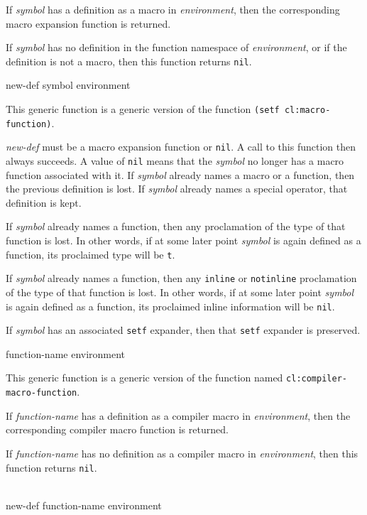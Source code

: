 If \textit{symbol} has a definition as a macro in
\textit{environment}, then the corresponding macro expansion function
is returned.

If \textit{symbol} has no definition in the function namespace of
\textit{environment}, or if the definition is not a macro, then this
function returns \texttt{nil}.

 {new-def symbol environment}

This generic function is a generic version of the \commonlisp{}
function \texttt{(setf cl:macro-function)}.

\textit{new-def} must be a macro expansion function or \texttt{nil}.
A call to this function then always succeeds.  A value of \texttt{nil}
means that the \textit{symbol} no longer has a macro function
associated with it.  If \textit{symbol} already names a macro or a
function, then the previous definition is lost.  If \textit{symbol}
already names a special operator, that definition is kept.

If \textit{symbol} already names a function, then any proclamation of
the type of that function is lost.  In other words, if at some later
point \textit{symbol} is again defined as a function, its proclaimed
type will be \texttt{t}.

If \textit{symbol} already names a function, then any \texttt{inline} or
\texttt{notinline} proclamation of the type of that function is lost.  In other
words, if at some later point \textit{symbol} is again defined as a
function, its proclaimed inline information will be \texttt{nil}.

If \textit{symbol} has an associated \texttt{setf} expander, then that
\texttt{setf} expander is preserved.

 {function-name environment}

This generic function is a generic version of the \commonlisp{}
function named \texttt{cl:compiler-macro-function}.

If \textit{function-name} has a definition as a compiler macro in
\textit{environment}, then the corresponding compiler macro function
is returned.

If \textit{function-name} has no definition as a compiler macro in
\textit{environment}, then this function returns \texttt{nil}.

\\
{new-def function-name environment}

